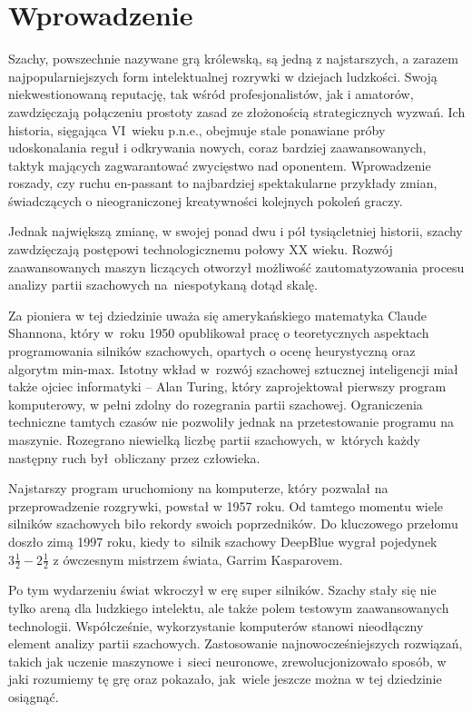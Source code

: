 \section{Wprowadzenie}
\label{sec:wprowadzenie}

Szachy, powszechnie nazywane grą królewską, są jedną z najstarszych, a zarazem najpopularniejszych form intelektualnej rozrywki w dziejach ludzkości.
Swoją niekwestionowaną reputację, tak wśród profesjonalistów, jak i amatorów, zawdzięczają połączeniu prostoty zasad ze złożonością strategicznych wyzwań.
Ich historia, sięgająca VI~wieku p.n.e., obejmuje stale ponawiane próby udoskonalania reguł i odkrywania nowych, coraz bardziej zaawansowanych, taktyk mających zagwarantować zwycięstwo nad oponentem.
Wprowadzenie roszady, czy ruchu en-passant to najbardziej spektakularne przykłady zmian, świadczących o nieograniczonej kreatywności kolejnych pokoleń graczy.


Jednak największą zmianę, w swojej ponad dwu i pół tysiącletniej historii, szachy zawdzięczają postępowi technologicznemu połowy XX wieku.
Rozwój zaawansowanych maszyn liczących otworzył możliwość zautomatyzowania procesu analizy partii szachowych na~niespotykaną dotąd skalę.


Za pioniera w tej dziedzinie uważa się amerykańskiego matematyka Claude Shannona, który w~roku 1950 opublikował pracę o teoretycznych aspektach programowania silników szachowych, opartych o ocenę heurystyczną oraz algorytm min-max.
Istotny wkład w~rozwój szachowej sztucznej inteligencji miał także ojciec informatyki – Alan Turing, który zaprojektował pierwszy program komputerowy, w pełni zdolny do rozegrania partii szachowej.
Ograniczenia techniczne tamtych czasów nie pozwoliły jednak na przetestowanie programu na maszynie.
Rozegrano niewielką liczbę partii szachowych, w~których każdy następny ruch był~obliczany przez człowieka.


Najstarszy program uruchomiony na komputerze, który pozwalał na przeprowadzenie rozgrywki, powstał w 1957 roku.
Od tamtego momentu wiele silników szachowych biło rekordy swoich poprzedników.
Do kluczowego przełomu doszło zimą 1997 roku, kiedy to~silnik szachowy DeepBlue wygrał pojedynek $3\frac{1}{2} - 2\frac{1}{2}$ z ówczesnym mistrzem świata, Garrim Kasparovem.


Po tym wydarzeniu świat wkroczył w erę super silników.
Szachy stały się nie tylko areną dla ludzkiego intelektu, ale także polem testowym zaawansowanych technologii.
Współcześnie, wykorzystanie komputerów stanowi nieodłączny element analizy partii szachowych.
Zastosowanie najnowocześniejszych rozwiązań, takich jak uczenie maszynowe i~sieci neuronowe, zrewolucjonizowało sposób, w jaki rozumiemy tę grę oraz pokazało, jak~wiele jeszcze można w tej dziedzinie osiągnąć.

